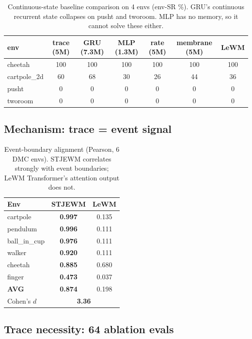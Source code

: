 \documentclass{article}
\begin{document}
\begin{table}[H]
\caption{Continuous-state baseline comparison on 4 envs (env-SR \%).
GRU's continuous recurrent state collapses on pusht and tworoom.
MLP has no memory, so it cannot solve these either.}
\label{tab:baselines}
\small
\begin{tabular}{lcccccc}
\toprule
env & trace (5M) & GRU (7.3M) & MLP (1.3M) & rate (5M) & membrane (5M) & LeWM \\
\midrule
cheetah       & 100 & 100 & 100 & 100 & 100 & 100 \\
cartpole\_2d  &  60 &  68 &  30 &  26 &  44 &  36 \\
pusht         &   0 &   0 &   0 &   0 &   0 &   0 \\
tworoom       &   0 &   0 &   0 &   0 &   0 &   0 \\
\bottomrule
\end{tabular}
\end{table}

\subsection{Mechanism: trace = event signal}

\begin{table}[H]
\caption{Event-boundary alignment (Pearson, 6 DMC envs). STJEWM correlates
strongly with event boundaries; LeWM Transformer's attention output does not.}
\label{tab:event}
\small
\begin{tabular}{lcc}
\toprule
Env & STJEWM & LeWM \\
\midrule
cartpole      & \textbf{0.997} & 0.135 \\
pendulum      & \textbf{0.996} & 0.111 \\
ball\_in\_cup & \textbf{0.976} & 0.111 \\
walker        & \textbf{0.920} & 0.111 \\
cheetah       & \textbf{0.885} & 0.680 \\
finger        & \textbf{0.473} & 0.037 \\
\midrule
\textbf{AVG}   & \textbf{0.874} & 0.198 \\
Cohen's $d$   & \multicolumn{2}{c}{\textbf{3.36}} \\
\bottomrule
\end{tabular}
\end{table}

\subsection{Trace necessity: 64 ablation evals}
\end{document}
